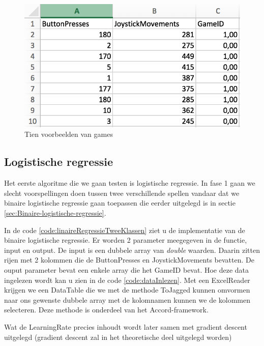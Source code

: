 \begin{figure}[]
	\centering
	\includegraphics{img/Dataset}
	\caption{Tien voorbeelden van games}
	\label{fig:regressieFig}
\end{figure}


\newpage

\subsection{Logistische regressie}
\label{sec:Logistischeregressie-fase1}

Het eerste algoritme die we gaan testen is logistische regressie. In fase 1 gaan we slecht voorspellingen doen tussen twee verschillende spellen vandaar dat we binaire logistische regressie gaan toepassen die eerder uitgelegd is in sectie \ref{sec:Binaire-logistische-regressie}.

In de code \ref{code:linaireRegressieTweeKlassen} ziet u de implementatie van de binaire logistische regressie. Er worden 2 parameter meegegeven in de functie, input en output. De input is een dubbele array van \textit{double} waarden. Daarin zitten rijen met 2 kolommen die de ButtonPresses en JoystickMovements bevatten. De ouput parameter bevat een enkele array die het GameID bevat. Hoe deze data ingelezen wordt kan u zien in de code \ref{code:dataInlezen}. Met een ExcelReader krijgen we een DataTable die we met de methode ToJagged kunnen omvormen naar ons gewenste dubbele array met de kolomnamen kunnen we de kolommen selecteren. Deze methode is onderdeel van het Accord-framework. 

Wat de LearningRate precies inhoudt wordt later samen met gradient descent uitgelegd (gradient descent zal in het theoretische deel uitgelegd worden)

